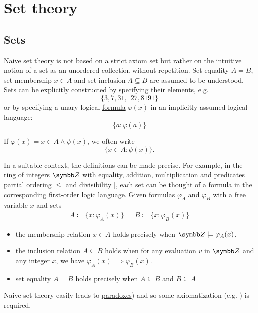 \section{Set theory}\label{sec:set_theory}
\subsection{Sets}\label{subsec:sets}

\begin{definition}\label{def:set_naive}
  Naive set theory is not based on a strict axiom set but rather on the intuitive notion of a set as an unordered collection without repetition. Set equality \( A = B \), set membership \( x \in A \) and set inclusion \( A \subseteq B \) are assumed to be understood. Sets can be explicitly constructed by specifying their elements, e.g.
  \begin{equation*}
    \{ 3, 7, 31, 127, 8191 \}
  \end{equation*}
  or by specifying a unary logical \hyperref[def:first_order_formula]{formula} \( \varphi(x) \) in an implicitly assumed logical language:
  \begin{equation*}
    \{ a \colon \varphi(a) \}
  \end{equation*}

  If \( \varphi(x) = x \in A \land \psi(x) \), we often write
  \begin{equation*}
    \{ x \in A \colon \psi(x) \}.
  \end{equation*}

  In a suitable context, the definitions can be made precise. For example, in the ring of integers \( \BZ \) with equality, addition, multiplication and predicates partial ordering \( \leq \) and divisibility \( \vert \), each set can be thought of a formula in the corresponding \hyperref[def:first_order_logic_language]{first-order logic language}. Given formulas \( \varphi_A \) and \( \varphi_B \) with a free variable \( x \) and sets
  \begin{align*}
    A \coloneqq \{ x \colon \varphi_A(x) \} &  & B \coloneqq \{ x \colon \varphi_B(x) \}
  \end{align*}

  \begin{itemize}
    \item the membership relation \( x \in A \) holds precisely when \( \BZ \models \varphi_A(x) \).

    \item the inclusion relation \( A \subseteq B \) holds when for any \hyperref[def:first_order_variable_assignment]{evaluation} \( v \) in \( \BZ \) and any integer \( x \), we have \( \varphi_A(x) \implies \varphi_B(x) \).

    \item set equality \( A = B \) holds precisely when \( A \subseteq B \) and \( B \subseteq A \)
  \end{itemize}

  Naive set theory easily leads to \hyperref[ex:russels_paradox_sets]{paradoxes}) and so some axiomatization (e.g. ) is required.
\end{definition}

